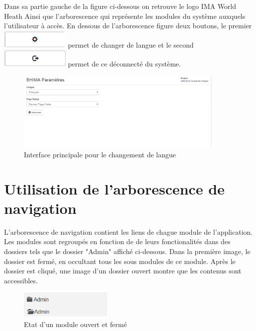 \documentclass[12pt,a4paper]{report}
\begin{document}
Dans sa partie gauche de la figure ci-dessous on retrouve le logo IMA World Heath Ainsi que l'arborescence qui représente les modules du système auxquels l'utilisateur à accès. En dessous de l'arborescence figure deux boutons, le premier \includegraphics[scale=0.5]{pic/lang.png} permet de changer de langue et le second \includegraphics[scale=0.5]{pic/logout.png} permet de ce déconnecté du système.

\begin{figure}[h]
\begin{center}
\includegraphics[width=10cm]{pic/changeLang.png}
\end{center}
\caption{Interface principale pour le changement de langue}
\label{Interface principale pour le changement de langue}
\end{figure} 

\section{Utilisation de l'arborescence de navigation}
L'arborescence de navigation contient les liens de chague module de l'application. Les modules sont regroupés en fonction de de leurs fonctionalités dans des dossiers tels que le dossier "Admin" affiché ci-dessous. Dans la première image, le dossier est fermé, en occultant tous les sous modules de ce module. Après le dossier est cliqué, une image d'un dossier ouvert montre que les contenus sont accessibles.

\begin{figure}[h]
\begin{center}
\includegraphics[width=4.5cm]{pic/folder_open_closed.png}
\end{center}
\caption{Etat d'un module ouvert et fermé}
\label{Etat d'un module ouvert et fermé}
\end{figure} 
\end{document}
